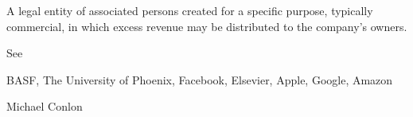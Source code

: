 \documentclass[letterpaper,10pt,english]{sphinxmanual}
\begin{document}
\begin{sphinxShadowBox}

\sphinxAtStartPar
{\hyperref[\detokenize{doc-ORG_0000001::doc}]{}}
\end{sphinxShadowBox}

\begin{sphinxShadowBox}

\sphinxAtStartPar
A legal entity of associated persons created for a specific purpose, typically commercial, in which excess revenue may be distributed to the company’s owners.
\end{sphinxShadowBox}

\begin{sphinxShadowBox}

\sphinxAtStartPar
See 
\end{sphinxShadowBox}

\begin{sphinxShadowBox}

\sphinxAtStartPar
BASF, The University of Phoenix, Facebook, Elsevier, Apple, Google, Amazon
\end{sphinxShadowBox}

\begin{sphinxShadowBox}

\sphinxAtStartPar
{}

\sphinxAtStartPar
{}
\end{sphinxShadowBox}

\begin{sphinxShadowBox}

\sphinxAtStartPar
Michael Conlon 
\end{sphinxShadowBox}
\begin{quote}

\ignorespaces \end{quote}
\end{document}
